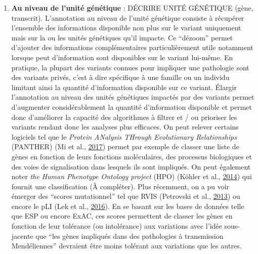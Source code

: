 \documentclass[12pt,twoside]{reedthesis}
\providecommand{\tightlist}{%
  \setlength{\itemsep}{0pt}\setlength{\parskip}{0pt}}
\theoremstyle{definition}
\theoremstyle{definition}
\theoremstyle{remark}
\begin{document}
  \begin{enumerate}
  \def\labelenumi{\arabic{enumi}.}
  \setcounter{enumi}{1}
  \tightlist
  \item
    \textbf{Au niveau de l'unité génétique} : DÉCRIRE UNITÉ GÉNÉTIQUE
    (gène, transcrit). L'annotation au niveau de l'unité génétique
    consiste à récupérer l'ensemble des informations disponible non plus
    sur le variant uniquement mais sur la ou les unités génétiques qu'il
    impacte. Ce ``dézoom'' permet d'ajouter des informations
    complémentaires particulièrement utile notamment lorsque peut
    d'information sont disponibles sur le variant lui-même. En pratique,
    la plupart des variants connues pour impliquer une pathologie sont des
    variants privés, c'est à dire spécifique à une famille ou un individu
    limitant ainsi la quantité d'information disponible sur ce variant.
    Élargir l'annotation au niveau des unités génétiques impactés par des
    variants permet d'augmenter considérablement la quantité d'information
    disponible et permet donc d'améliorer la capacité des algorithmes à
    filtrer et / ou prioriser les variants rendant donc les analyses plus
    efficaces. On peut relever certains logiciels tel que le \emph{Protein
    ANalysis THrough Evolutionary Relationships} (PANTHER) (Mi et al.,
    \protect\hyperlink{ref-Mi2017}{2017}) permet par exemple de classer
    une liste de gènes en fonction de leurs fonctions moléculaires, des
    processus biologiques et des voies de signalisation dans lesquels ils
    sont impliqués. On peut également noter \emph{the Human Phenotype
    Ontology project} (HPO) (Köhler et al.,
    \protect\hyperlink{ref-Kohler2014}{2014}) qui fournit une
    classification (À compléter). Plus récemment, on a pu voir émerger des
    ``scores mutationnel'' tel que RVIS (Petrovski et al.,
    \protect\hyperlink{ref-Petrovski2013}{2013}) ou encore le pLI (Lek et
    al., \protect\hyperlink{ref-Lek2016}{2016}). En se basant sur les
    bases de données telle que ESP ou encore ExAC, ces scores permettent
    de classer les gènes en fonction de leur tolérance (ou intolérance)
    aux variations avec l'idée sous-jacente que ``les gènes impliqués dans
    des pathologies à transmission Mendéliennes'' devraient être moins
    tolérant aux variations que les autres.
  \end{enumerate}
  
\end{document}
